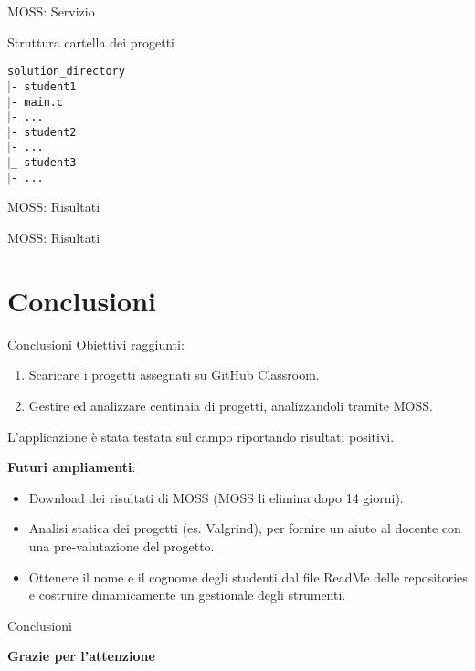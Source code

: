 \documentclass{beamer}
\newcommand\tab[1][1cm]{\hspace*{#1}}	%
\begin{document}
	\begin{frame}{MOSS: Servizio}
		\begin{block}{Struttura cartella dei progetti}
		 	\begin{tcolorbox}
				\texttt{\tab solution\_directory\\ 
					\tab $\vert$- student1\\
					\tab[1.5cm] $\vert$- main.c\\
					\tab[1.5cm] $\vert$- ...\\
					\tab $\vert$- student2\\
					\tab[1.5cm] $\vert$- ...\\
					\tab $\vert$\_ student3\\
					\tab[1.5cm] $\vert$- ...
				}
			\end{tcolorbox}
		\end{block}
	\end{frame}
	
	\begin{frame}{MOSS: Risultati}
		\begin{adjustwidth}{-1cm}{-1cm}
		\end{adjustwidth}
	\end{frame}



	\begin{frame}{MOSS: Risultati}
		\begin{adjustwidth}{-1cm}{-1cm}
		\end{adjustwidth}
	\end{frame}

	\section{Conclusioni}

	
	\begin{frame}{Conclusioni}
		Obiettivi raggiunti:
		\begin{enumerate}
			\item Scaricare i progetti assegnati su GitHub Classroom.
			\item Gestire ed analizzare centinaia di progetti, analizzandoli tramite MOSS.
		\end{enumerate}
		L'applicazione è stata testata sul campo riportando risultati positivi.
		\pause
		
		\vspace{0.5cm}
		{\small \textbf{Futuri ampliamenti}:
		\begin{itemize}
			\item Download dei risultati di MOSS (MOSS li elimina dopo 14 giorni).
			\item Analisi statica dei progetti (es. Valgrind), per fornire un aiuto al docente con una pre-valutazione del progetto.
			\item Ottenere il nome e il cognome degli studenti dal file ReadMe delle repositories e costruire dinamicamente un gestionale degli strumenti.
		\end{itemize}}
	\end{frame}

	\begin{frame}{Conclusioni}
		\begin{center}
			{\Huge \textcolor{rossoPantano}{\textbf{Grazie per l'attenzione}}}
		\end{center}
		
	\end{frame}
\end{document}
